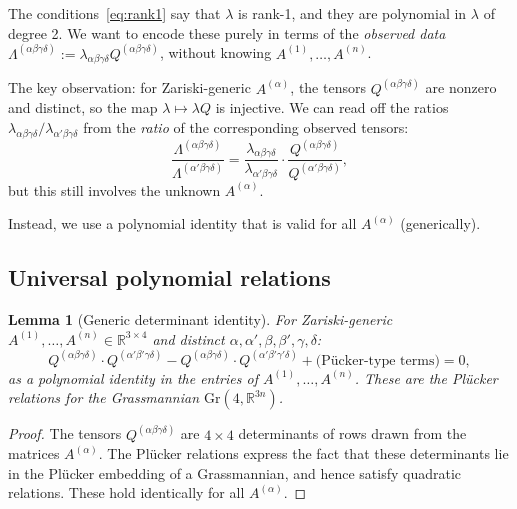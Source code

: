 \documentclass[12pt]{article}
\newtheorem{lemma}[theorem]{Lemma}
\theoremstyle{definition}
\theoremstyle{remark}
\begin{document}
The conditions~\eqref{eq:rank1} say that $\lambda$ is rank-1, and they are
polynomial in $\lambda$ of degree 2.  We want to encode these purely in terms
of the \emph{observed data}
$\Lambda^{(\alpha\beta\gamma\delta)} := \lambda_{\alpha\beta\gamma\delta}
Q^{(\alpha\beta\gamma\delta)}$,
without knowing $A^{(1)},\dots,A^{(n)}$.

The key observation: for Zariski-generic $A^{(\alpha)}$, the tensors
$Q^{(\alpha\beta\gamma\delta)}$ are nonzero and distinct, so the map
$\lambda\mapsto\lambda Q$ is injective.  We can read off the ratios
$\lambda_{\alpha\beta\gamma\delta}/\lambda_{\alpha'\beta\gamma\delta}$ from the
\emph{ratio} of the corresponding observed tensors:
\[
  \frac{\Lambda^{(\alpha\beta\gamma\delta)}}{\Lambda^{(\alpha'\beta\gamma\delta)}}
  = \frac{\lambda_{\alpha\beta\gamma\delta}}{\lambda_{\alpha'\beta\gamma\delta}}
    \cdot\frac{Q^{(\alpha\beta\gamma\delta)}}{Q^{(\alpha'\beta\gamma\delta)}},
\]
but this still involves the unknown $A^{(\alpha)}$.

Instead, we use a polynomial identity that is valid for all
$A^{(\alpha)}$ (generically).

\subsection{Universal polynomial relations}

\begin{lemma}[Generic determinant identity]\label{lem:gendet}
For Zariski-generic $A^{(1)},\dots,A^{(n)}\in\mathbb{R}^{3\times 4}$ and
distinct $\alpha,\alpha',\beta,\beta',\gamma,\delta$:
\begin{equation}\label{eq:Plucker}
  Q^{(\alpha\beta\gamma\delta)}\cdot Q^{(\alpha'\beta'\gamma\delta)}
  - Q^{(\alpha\beta\gamma\delta)}\cdot Q^{(\alpha'\beta'\gamma'\delta)}
  + \text{(P\"ucker-type terms)} = 0,
\end{equation}
as a polynomial identity in the entries of $A^{(1)},\dots,A^{(n)}$.
These are the \emph{Pl\"ucker relations} for the Grassmannian
$\mathrm{Gr}(4,\mathbb{R}^{3n})$.
\end{lemma}

\begin{proof}
The tensors $Q^{(\alpha\beta\gamma\delta)}$ are $4\times 4$ determinants
of rows drawn from the matrices $A^{(\alpha)}$.  The Pl\"ucker relations
express the fact that these determinants lie in the Pl\"ucker embedding of
a Grassmannian, and hence satisfy quadratic relations.  These hold identically
for all $A^{(\alpha)}$.
\end{proof}
\end{document}
